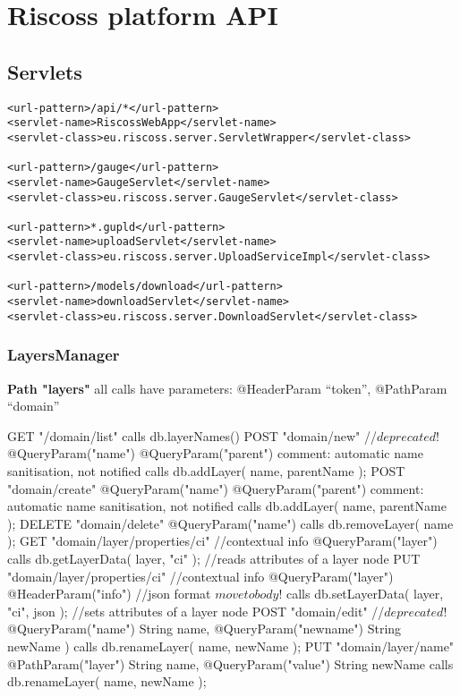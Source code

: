 \section{Riscoss platform API}

\subsection{Servlets}
\begin{verbatim}
<url-pattern>/api/*</url-pattern>
<servlet-name>RiscossWebApp</servlet-name>
<servlet-class>eu.riscoss.server.ServletWrapper</servlet-class>

<url-pattern>/gauge</url-pattern>
<servlet-name>GaugeServlet</servlet-name>
<servlet-class>eu.riscoss.server.GaugeServlet</servlet-class>

<url-pattern>*.gupld</url-pattern>
<servlet-name>uploadServlet</servlet-name>
<servlet-class>eu.riscoss.server.UploadServiceImpl</servlet-class>

<url-pattern>/models/download</url-pattern>
<servlet-name>downloadServlet</servlet-name>
<servlet-class>eu.riscoss.server.DownloadServlet</servlet-class>
\end{verbatim}

\subsubsection{LayersManager}

\textbf{Path "layers"}
all calls have parameters: 
    @HeaderParam ``token'', 
    @PathParam ``domain''

  GET "/{domain}/list"
    calls db.layerNames()
  POST "{domain}/new" //$deprecated!$
	  @QueryParam("name")
	  @QueryParam("parent")
	  comment: automatic name sanitisation, not notified
	calls db.addLayer( name, parentName );  
  POST "{domain}/create"
  	  @QueryParam("name")
	  @QueryParam("parent")
	  comment: automatic name sanitisation, not notified
	calls db.addLayer( name, parentName );
  DELETE "{domain}/delete"
  	  @QueryParam("name")
      calls db.removeLayer( name );
   GET "{domain}/{layer}/properties/ci"  //contextual info
	  @QueryParam("layer")
    calls db.getLayerData( layer, "ci" );  //reads attributes of a layer node
  PUT "{domain}/{layer}/properties/ci"   //contextual info
	  @QueryParam("layer")
	  @HeaderParam("info")  //json format $move to body!$
	calls db.setLayerData( layer, "ci", json ); //sets attributes of a layer node
  POST "{domain}/edit"  //$deprecated!$
	@QueryParam("name") String name, 
	@QueryParam("newname") String newName )
      calls db.renameLayer( name, newName );
   PUT "{domain}/{layer}/name"
	@PathParam("layer") String name, 
	@QueryParam("value") String newName 
      calls db.renameLayer( name, newName );
      

